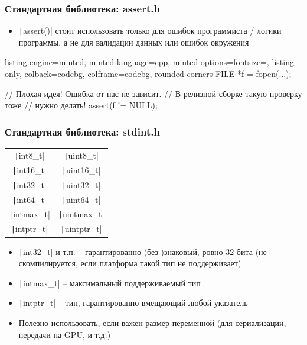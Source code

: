 \documentclass[10pt]{beamer}
\begin{document}
\begin{frame}[fragile]
\frametitle{Стандартная библиотека: assert.h}
\begin{itemize}
\item \texttt|assert()| стоит использовать только для ошибок программиста / логики программы, а не для валидации данных или ошибок окружения
\end{itemize}
\pause
{}
\begin{tcblisting}{listing engine=minted, minted language=cpp, minted options={fontsize=\scriptsize}, listing only, colback=codebg, colframe=codebg, rounded corners}
FILE *f = fopen(...);

// Плохая идея! Ошибка от нас не зависит.
// В релизной сборке такую проверку тоже
// нужно делать!
assert(f != NULL);
\end{tcblisting}
\end{frame}

\begin{frame}[fragile]
\frametitle{Стандартная библиотека: stdint.h}
\begin{center}
  \begin{tabular}{ c c }
    \hline
    \texttt|int8_t| & \texttt|uint8_t| \\
    \texttt|int16_t| & \texttt|uint16_t| \\
    \texttt|int32_t| & \texttt|uint32_t| \\
    \texttt|int64_t| & \texttt|uint64_t| \\
    \hline
    \texttt|intmax_t| & \texttt|uintmax_t| \\
    \texttt|intptr_t| & \texttt|uintptr_t| \\
    \hline
  \end{tabular}
\end{center}
\pause
\begin{itemize}
\item \texttt|int32_t| и т.п. -- гарантированно (без-)знаковый, ровно 32 бита (не скомпилируется, если платформа такой тип не поддерживает)
\pause
\item \texttt|intmax_t| -- максимальный поддерживаемый тип
\pause
\item \texttt|intptr_t| -- тип, гарантированно вмещающий любой указатель
\pause
\item Полезно использовать, если важен размер переменной (для сериализации, передачи на GPU, и т.д.)
\end{itemize}
\end{frame}
\end{document}
